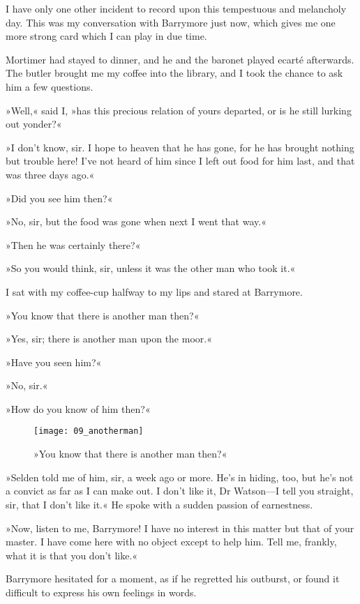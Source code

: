 I have only one other incident to record upon this tempestuous and melancholy day. This was my conversation with Barrymore just now, which gives me one more strong card which I can play in due time.

Mortimer had stayed to dinner, and he and the baronet played ecarté afterwards. The butler brought me my coffee into the library, and I took the chance to ask him a few questions.

»Well,« said I, »has this precious relation of yours departed, or is he still lurking out yonder?«

»I don't know, sir. I hope to heaven that he has gone, for he has brought nothing but trouble here! I've not heard of him since I left out food for him last, and that was three days ago.«

»Did you see him then?«

»No, sir, but the food was gone when next I went that way.«

»Then he was certainly there?«

»So you would think, sir, unless it was the other man who took it.«

I sat with my coffee-cup halfway to my lips and stared at Barrymore.

»You know that there is another man then?«

»Yes, sir; there is another man upon the moor.«

»Have you seen him?«

»No, sir.«

»How do you know of him then?«

\begin{figure}[tbh]
\centering
\texttt{[image: 09\_anotherman]}
\caption{»You know that there is another man then?«}
\end{figure}

»Selden told me of him, sir, a week ago or more. He's in hiding, too, but he's not a convict as far as I can make out. I don't like it, Dr Watson\allowbreak---\allowbreak I tell you straight, sir, that I don't like it.« He spoke with a sudden passion of earnestness.

»Now, listen to me, Barrymore! I have no interest in this matter but that of your master. I have come here with no object except to help him. Tell me, frankly, what it is that you don't like.«

Barrymore hesitated for a moment, as if he regretted his outburst, or found it difficult to express his own feelings in words.

